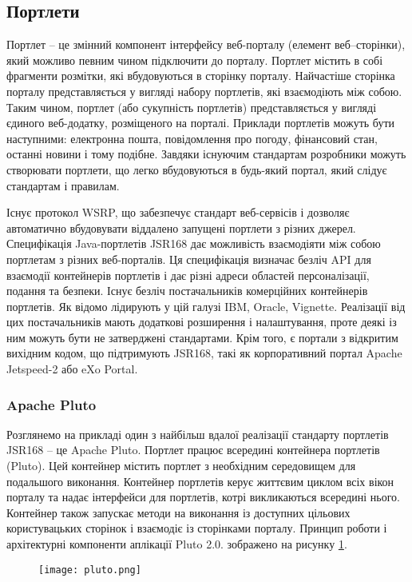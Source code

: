 \subsection{Портлети}
Портлет -- це змінний компонент інтерфейсу веб-порталу (елемент веб--сторінки), який можливо певним чином підключити до порталу.
Портлет містить в собі фрагменти розмітки, які вбудовуються в сторінку порталу. 
Найчастіше сторінка порталу представляється у вигляді набору портлетів, які взаємодіють між собою. 
Таким чином, портлет (або сукупність портлетів) представляється у вигляді єдиного веб-додатку, розміщеного на порталі. 
Приклади портлетів можуть бути наступними: електронна пошта, повідомлення про погоду, фінансовий стан, останні новини і тому подібне.
Завдяки існуючим стандартам розробники можуть створювати портлети, що легко вбудовуються в будь-який портал, який слідує стандартам і правилам.
\par Існує протокол WSRP, що забезпечує стандарт веб-сервісів і дозволяє автоматично вбудовувати віддалено запущені портлети з різних джерел.
Специфікація Java-портлетів JSR168 дає можливість взаємодіяти між собою портлетам з різних веб-порталів. 
Ця специфікація визначає безліч API для взаємодії контейнерів портлетів і дає різні адреси областей персоналізації, подання та безпеки.
Існує безліч постачальників комерційних контейнерів портлетів. 
Як відомо лідирують у цій галузі IBM, Oracle, Vignette. 
Реалізації від цих постачальників мають додаткові розширення і налаштування, проте деякі із ним можуть бути не затверджені стандартами. 
Крім того, є портали з відкритим вихідним кодом, що підтримують JSR168, такі як корпоративний портал Apache Jetspeed-2 або eXo Portal.
\subsubsection{Apache Pluto}
Розглянемо на прикладі один з найбільш вдалої реалізації стандарту портлетів JSR168 -- це Apache Pluto.
Портлет працює всередині контейнера портлетів (Pluto).
Цей контейнер містить портлет з необхідним середовищем для подальшого виконання.
Контейнер портлетів керує життєвим циклом всіх вікон порталу та надає інтерфейси для портлетів, котрі викликаються всередині нього.
Контейнер також запускає методи на виконання із доступних цільових користувацьких сторінок і взаємодіє із сторінками порталу. Принцип роботи і архітектурні компоненти аплікації Pluto 2.0. зображено на рисунку \ref{pic:pluto}.

    \begin{figure}[!ht]
		\centering
		\texttt{[image: pluto.png]}
		\vspace{6 pt}
		\label{pic:pluto}
	\end{figure}



